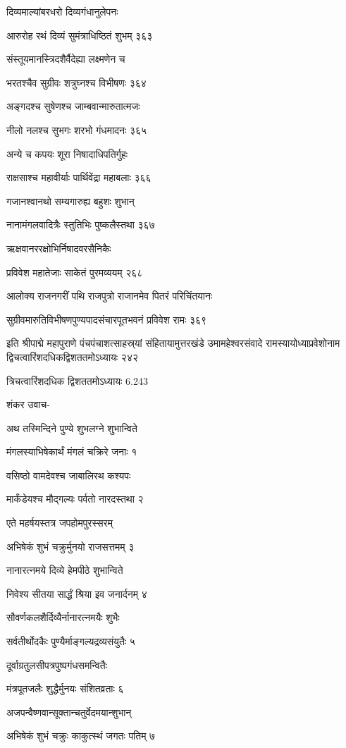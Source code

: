 दिव्यमाल्यांबरधरो दिव्यगंधानुलेपनः

आरुरोह रथं दिव्यं सुमंत्राधिष्ठितं शुभम् ३६३

संस्तूयमानस्त्रिदशैर्वैदेह्या लक्ष्मणेन च

भरतश्चैव सुग्रीवः शत्रुघ्नश्च विभीषणः ३६४

अङ्गदश्च सुषेणश्च जाम्बवान्मारुतात्मजः

नीलो नलश्च सुभगः शरभो गंधमादनः ३६५

अन्ये च कपयः शूरा निषादाधिपतिर्गुहः

राक्षसाश्च महावीर्याः पार्थिवेंद्रा महाबलाः ३६६

गजानश्वानथो सम्यगारुह्य बहुशः शुभान्

नानामंगलवादित्रैः स्तुतिभिः पुष्कलैस्तथा ३६७

ऋक्षवानररक्षोभिर्निषादवरसैनिकैः

प्रविवेश महातेजाः साकेतं पुरमव्ययम् २६८

आलोक्य राजनगरीं पथि राजपुत्रो राजानमेव पितरं परिचिंतयानः

सुग्रीवमारुतिविभीषणपुण्यपादसंचारपूतभवनं प्रविवेश रामः ३६९

इति श्रीपाद्मे महापुराणे पंचपंचाशत्साहस्र्यां संहितायामुत्तरखंडे उमामहेश्वरसंवादे
रामस्यायोध्याप्रवेशोनाम द्विचत्वारिंशदधिकद्विशततमोऽध्यायः २४२

त्रिचत्वारिंशदधिक द्विशततमोऽध्यायः 6.243

शंकर उवाच-

अथ तस्मिन्दिने पुण्ये शुभलग्ने शुभान्विते

मंगलस्याभिषेकार्थं मंगलं चक्रिरे जनाः १

वसिष्ठो वामदेवश्च जाबालिरथ कश्यपः

मार्कंडेयश्च मौद्गल्यः पर्वतो नारदस्तथा २

एते महर्षयस्तत्र जपहोमपुरस्सरम्

अभिषेकं शुभं चक्रुर्मुनयो राजसत्तमम् ३

नानारत्नमये दिव्ये हेमपीठे शुभान्विते

निवेश्य सीतया सार्द्धं श्रिया इव जनार्दनम् ४

सौवर्णकलशैर्दिव्यैर्नानारत्नमयैः शुभैः

सर्वतीर्थोदकैः पुण्यैर्माङ्गल्यद्रव्यसंयुतैः ५

दूर्वाग्रतुलसीपत्रपुष्पगंधसमन्वितैः

मंत्रपूतजलैः शुद्धैर्मुनयः संशितव्रताः ६

अजपन्वैष्णवान्सूक्तान्चतुर्वेदमयान्शुभान्

अभिषेकं शुभं चक्रुः काकुत्स्थं जगतः पतिम् ७

